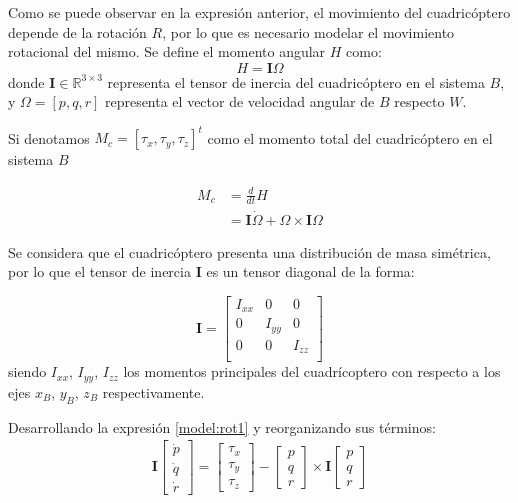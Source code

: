 Como se puede observar en la expresión anterior, el movimiento del cuadricóptero depende de la rotación $R$, por lo que es necesario modelar el movimiento rotacional del mismo. Se define el momento angular $H$ como:
\begin{equation}
	H = \mathbf{I}\Omega
\end{equation}
donde $\mathbf{I} \in \mathbb{R}^{3\times 3}$ representa el tensor de inercia del cuadricóptero en el sistema $B$, y $\Omega  = [p, q, r]$ representa el vector de velocidad angular de $B$ respecto $W$. 

Si denotamos $M_c = [\tau_x, \tau_y, \tau_z]^t$ como el momento total del cuadricóptero en el sistema $B$

\begin{align}
	M_c &= \frac{d}{dt}H\nonumber\\
		&= \mathbf{I}\dot{\Omega}+\Omega\times\mathbf{I}\Omega
	\label{model:rot1}
\end{align}

Se considera que el cuadricóptero presenta una distribución de masa simétrica, por lo que el tensor de inercia $\mathbf{I}$ es un tensor diagonal de la forma:

\begin{equation}
	\mathbf{I} = \begin{bmatrix}
		I_{xx}&0&0\\
		0&I_{yy}&0\\
		0&0&I_{zz}\\
	\end{bmatrix}
\end{equation}
siendo $I_{xx}$, $I_{yy}$, $I_{zz}$ los momentos principales del cuadrícoptero con respecto a los ejes $x_B$, $y_B$, $z_B$ respectivamente.

Desarrollando la expresión \ref{model:rot1} y reorganizando sus términos:
\begin{align}
\mathbf{I}\begin{bmatrix}
	\dot{p}\\
	\dot{q}\\
	\dot{r}
\end{bmatrix}=
\begin{bmatrix}
	\tau_x\\
	\tau_y\\
	\tau_z
\end{bmatrix} -\begin{bmatrix}
	p\\
	q\\
	r
\end{bmatrix} \times\mathbf{I}\begin{bmatrix}
	p\\
	q\\
	r
\end{bmatrix}\label{model:rot2}
\end{align}

